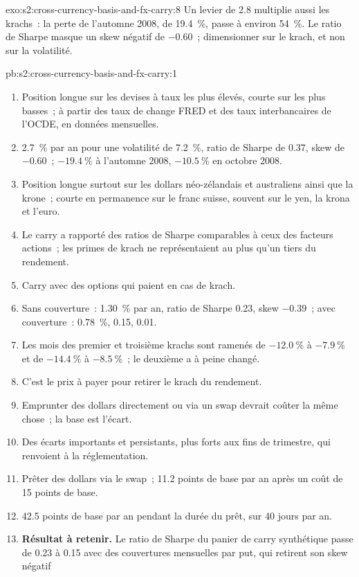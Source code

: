 \begin{solution}{exo:s2:cross-currency-basis-and-fx-carry:8}
Un levier de 2.8 multiplie aussi les krachs~: la perte de l'automne 2008, de 19.4~\%, passe à environ 54~\%. Le ratio de Sharpe masque un skew négatif de $-0.60$~;
dimensionner sur le krach, et non sur la volatilité.
\end{solution}

\begin{solution}{pb:s2:cross-currency-basis-and-fx-carry:1}
\begin{enumerate}
\item Position longue sur les devises à taux les plus élevés, courte sur les plus basses~; à partir des taux de change FRED et des taux interbancaires de l'OCDE, en données mensuelles.
\item 2.7~\% par an pour une volatilité de 7.2~\%, ratio de Sharpe de 0.37, skew de $-0.60$~; $-19.4~\%$ à l'automne 2008, $-10.5~\%$ en octobre 2008.
\item Position longue surtout sur les dollars néo-zélandais et australiens ainsi que la krone~; courte en permanence sur le franc suisse, souvent sur le yen, la krona et l'euro.
\item Le carry a rapporté des ratios de Sharpe comparables à ceux des facteurs actions~; les primes de krach ne représentaient au plus qu'un tiers du rendement.
\item Carry avec des options qui paient en cas de krach.
\item Sans couverture~: 1.30~\% par an, ratio de Sharpe 0.23, skew $-0.39$~; avec couverture~: 0.78~\%, 0.15, 0.01.
\item Les mois des premier et troisième krachs sont ramenés de $-12.0~\%$ à $-7.9~\%$ et de $-14.4~\%$ à $-8.5~\%$~; le deuxième a à peine changé.
\item C'est le prix à payer pour retirer le krach du rendement.
\item Emprunter des dollars directement ou via un swap devrait coûter la même chose~; la base est l'écart.
\item Des écarts importants et persistants, plus forts aux fins de trimestre, qui renvoient à la réglementation.
\item Prêter des dollars via le swap~; 11.2 points de base par an après un coût de 15 points de base.
\item 42.5 points de base par an pendant la durée du prêt, sur 40 jours par an.
\item \textbf{Résultat à retenir.} Le ratio de Sharpe du panier de carry synthétique passe de 0.23 à 0.15 avec des couvertures mensuelles par put, qui retirent son skew négatif

\end{enumerate}
\end{solution}
